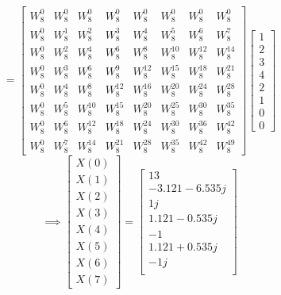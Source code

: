 \documentclass[journal,12pt,twocolumn]{IEEEtran}
\renewcommand\thesection{\arabic{section}}
\begin{document}
\begin{enumerate}[label=\thesection.\arabic*.,ref=\thesection.\theenumi]
\begin{equation}
=
\begin{bmatrix}
W^{0}_{8} & W^{0}_{8} & W^{0}_{8} & W^{0}_{8} & W^{0}_{8} & W^{0}_{8} & W^{0}_{8} & W^{0}_{8}\\
W^{0}_{8} & W^{1}_{8} & W^{2}_{8} & W^{3}_{8} & W^{4}_{8} & W^{5}_{8} & W^{6}_{8} & W^{7}_{8}\\
W^{0}_{8} & W^{2}_{8} & W^{4}_{8} & W^{6}_{8} & W^{8}_{8} & W^{10}_{8} & W^{12}_{8} & W^{14}_{8}\\
W^{0}_{8} & W^{3}_{8} & W^{6}_{8} & W^{9}_{8} & W^{12}_{8} & W^{15}_{8} & W^{18}_{8} & W^{21}_{8}\\
W^{0}_{8} & W^{4}_{8} & W^{8}_{8} & W^{12}_{8} & W^{16}_{8} & W^{20}_{8} & W^{24}_{8} & W^{28}_{8}\\
W^{0}_{8} & W^{5}_{8} & W^{10}_{8} & W^{15}_{8} & W^{20}_{8} & W^{25}_{8} & W^{30}_{8} & W^{35}_{8}\\
W^{0}_{8} & W^{6}_{8} & W^{12}_{8} & W^{18}_{8} & W^{24}_{8} & W^{30}_{8} & W^{36}_{8} & W^{42}_{8}\\
W^{0}_{8} & W^{7}_{8} & W^{14}_{8} & W^{21}_{8} & W^{28}_{8} & W^{35}_{8} & W^{42}_{8} & W^{49}_{8}
\end{bmatrix}
\begin{bmatrix}
1 \\
2 \\
3 \\
4 \\
2 \\
1 \\
0 \\
0
\end{bmatrix}
\end{equation}
\begin{equation}
\implies
\begin{bmatrix}
X(0) \\
X(1) \\
X(2) \\
X(3) \\
X(4) \\
X(5) \\
X(6) \\
X(7)
\end{bmatrix}
=
\begin{bmatrix}
13 \\
-3.121 - 6.535j \\
1j \\
1.121 - 0.535j \\
-1 \\
1.121 + 0.535j \\
-1j \\

\end{bmatrix}
\end{equation}
\end{enumerate}
\end{document}
